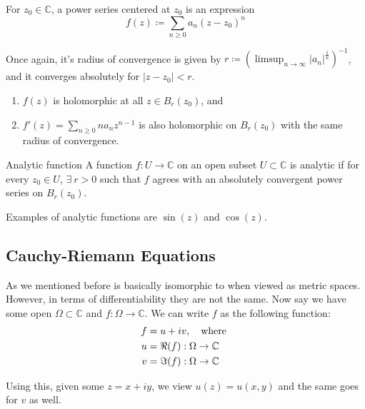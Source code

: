 \documentclass{article}
\begin{document}
For \( z_0 \in \mathbb{C}  \), a power series centered at \( z_0 \) is an expression
\[
    f(z) \coloneqq \sum_{n\geq 0} a_{n}(z - z_0)^n 
\]

Once again, it's radius of convergence is given by \( r\coloneqq (\limsup_{n \to \infty} |a_{n} |^\frac{1}{n})^{-1} \), and it converges absolutely for \( |z - z_0| < r \).

\begin{thrm}{}{}
\begin{enumerate}[]
    \item $f(z)$ is holomorphic at all \( z \in  B_{r} (z_0) \), and 
    \item \( f'(z) = \sum_{n\geq 0} na_{n} z^{n- 1}   \) is also holomorphic on \( B_{r} (z_0) \) with the same radius of convergence. 
\end{enumerate}
\end{thrm}

\begin{defn}{Analytic function}{}
A function \( f: U \to \mathbb{C}  \) on an open subset \( U \subset \mathbb{C}  \) is analytic if for every \( z_0\in  U \), \( \exists \ r>0  \) such that \( f \) agrees with an absolutely convergent power series on \( B_{r}(z_0) \). 
\end{defn}

Examples of analytic functions are \( \sin (z) \) and \( \cos (z) \). 

\subsection{Cauchy-Riemann Equations}

As we mentioned before \C{} is basically isomorphic to  when viewed as metric spaces. However, in terms of differentiability they are not the same. Now say we have some open \( \Omega \subset \mathbb{C} \) and \( f: \Omega \to \mathbb{C}  \). We can write \( f \) as the following function:
\begin{align*}
    f &= u + iv, \text{\quad where } \\ 
    u &= \Re (f): \Omega \to \mathbb{C} \\
    v &= \Im (f): \Omega \to \mathbb{C} 
\end{align*}

Using this, given some \( z = x + iy \), we view \( u(z) = u(x,y) \) and the same goes for \( v \) as well. 
\end{document}
